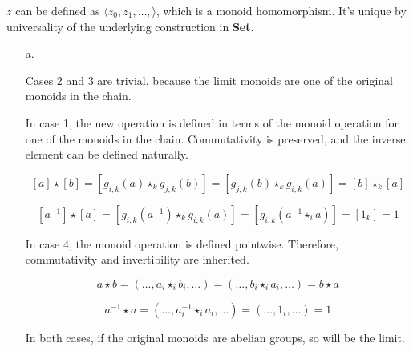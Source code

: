\documentclass{article}
\begin{document}
\begin{enumerate}
\begin{itemize}
         

         $z$ can be defined as $\langle z_0, z_1, …, \rangle$, which is
         a monoid homomorphism. It's unique by universality of the
         underlying construction in {\bf Set}.

     \end{itemize}
     

     \begin{enumerate}

       \item[a.]

         Cases 2 and 3 are trivial, because the limit monoids are
         one of the original monoids in the chain.

         In case 1, the new operation is defined in terms of the monoid
         operation for one of the monoids in the chain. Commutativity is
         preserved, and the inverse element can be defined naturally.

         $$[a] \star [b] = \left [ g_{i,k}(a) \star_k g_{j,k}(b) \right ] = \left [ g_{j,k}(b) \star_k g_{i,k}(a) \right ] = [b] \star_k [a]$$
         
         $$[a^{-1}] \star [a] = \left [ g_{i,k}(a^{-1}) \star_k g_{i,k}(a) \right ] = \left [ g_{i,k}(a^{-1} \star_i a) \right ] = [1_k] = 1$$
         
         In case 4, the monoid operation is defined pointwise.
         Therefore, commutativity and invertibility are inherited.

         $$a \star b = (…, a_i \star_i b_i, …) = (…, b_i \star_i a_i, …) = b \star a$$
         
         $$a^{-1} \star a = (…, a_i^{-1} \star_i a_i, …) = (…, 1_i, …) = 1$$

         In both cases, if the original monoids are abelian groups, so
         will be the limit.


\end{enumerate}
\end{enumerate}
\end{document}
